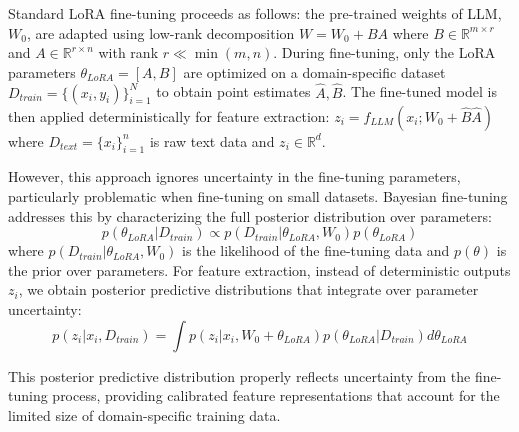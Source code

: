 \documentclass[11pt]{article}
\begin{document}
Standard LoRA fine-tuning proceeds as follows: the pre-trained weights of LLM, $W_0$, are adapted using low-rank decomposition $W = W_0 + BA$ where $B \in \mathbb{R}^{m \times r}$ and $A \in \mathbb{R}^{r \times n}$ with rank $r \ll \min(m, n)$. 
During fine-tuning, only the LoRA parameters $\theta_{LoRA} = [A, B]$ are optimized on a domain-specific dataset $D_{train} = \{(x_i, y_i)\}_{i=1}^N$ to obtain point estimates $\hat{A}, \hat{B}$. 
The fine-tuned model is then applied deterministically for feature extraction: $z_i = f_{LLM}(x_i; W_0 + \hat{B}\hat{A})$ where $D_{text} = \{x_i\}_{i=1}^n$ is raw text data and $z_i \in \mathbb{R}^d$.

However, this approach ignores uncertainty in the fine-tuning parameters, 
particularly problematic when fine-tuning on small datasets. 
Bayesian fine-tuning \citep{yang2023bayesian, wang2024blob} addresses this by characterizing 
the full posterior distribution over parameters:
\begin{equation}
p(\theta_{LoRA}|D_{train}) \propto p(D_{train}|\theta_{LoRA}, W_0)p(\theta_{LoRA})
\end{equation}
where $p(D_{train}|\theta_{LoRA}, W_0)$ is the likelihood of the fine-tuning data and $p(\theta)$ is the prior over parameters. For feature extraction, instead of deterministic outputs $z_i$, we obtain posterior predictive distributions that integrate over parameter uncertainty:
\begin{equation}
p(z_i|x_i, D_{train}) = \int p(z_i|x_i, W_0 + \theta_{LoRA})p(\theta_{LoRA}|D_{train})d\theta_{LoRA}
\end{equation}

This posterior predictive distribution properly reflects uncertainty from the fine-tuning process, 
providing calibrated feature representations that account for the limited size of 
domain-specific training data.
\end{document}
